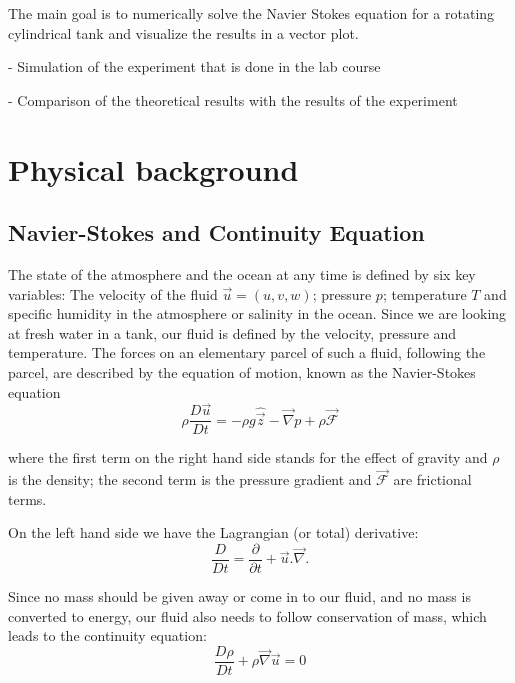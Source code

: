 \documentclass[12pt, a4paper]{article} %
\begin{document}
	The main goal is to numerically solve the Navier Stokes equation for a rotating cylindrical tank and visualize the results in a vector plot. 
	
	- Simulation of the experiment that is done in the lab course
	
	- Comparison of the theoretical results with the results of the experiment

\newpage

\section{Physical background}

	\subsection{Navier-Stokes and Continuity Equation}
		
		The state of the atmosphere and the ocean at any time is defined by six key variables:
		The velocity of the fluid $\vec{u}=(u,v,w)$; pressure $p$; temperature $T$ and specific humidity in the atmosphere or salinity in the ocean. Since we are looking at fresh water in a tank, our fluid is defined by the velocity, pressure and temperature. The forces on an elementary parcel of such a fluid, following the parcel, are described by the equation of motion, known as the Navier-Stokes equation
		\begin{equation}
			\rho \frac{D\vec{u}}{Dt} = -\rho g \hat{\vec{z}} - \vec{\nabla} p + \rho \vec{\mathcal{F}}
			\label{eq:Simple NSG}
		\end{equation} 
		
		where the first term on the right hand side stands for the effect of gravity and $\rho$ is the density; the second term is the pressure gradient and $\vec{\mathcal{F}}$ are frictional terms.
		
		On the left hand side we have the Lagrangian (or total) derivative:
		\begin{equation}
			\frac{D}{Dt} = \frac{\partial}{\partial t} + \vec{u}.\vec{\nabla}.
			\label{eq:Lag Dev}
		\end{equation} 
		
		
		Since no mass should be given away or come in to our fluid, and no mass is converted to energy, our fluid also needs to follow conservation of mass, which leads to the continuity equation:
		\begin{equation}
			\frac{D\rho}{Dt} + \rho \vec{\nabla} \vec{u} = 0
			\label{eq:Continuity}
		\end{equation}
		
\end{document}
